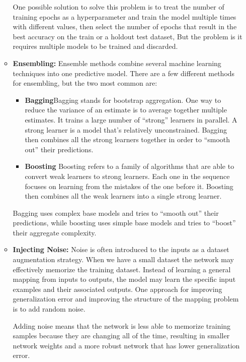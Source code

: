 \begin{itemize}
\begin{itemize}
    One possible solution to solve this problem is to treat the number of training epochs as a hyperparameter and train the model multiple times with different values, then select the number of epochs that result in the best accuracy on the train or a holdout test dataset, But the problem is it requires multiple models to be trained and discarded. \cite{goodfellow2016deep}\\
    \item \textbf{Ensembling: } Ensemble methods combine several machine learning techniques into one predictive model. There are a few different methods for ensembling, but the two most common are:
    \begin{itemize}
        \item \textbf{Bagging}Bagging stands for bootstrap aggregation. One way to reduce the variance of an estimate is to average together multiple estimates.
        It trains a large number of “strong” learners in parallel.
        A strong learner is a model that’s relatively unconstrained.
        Bagging then combines all the strong learners together in order to “smooth out” their predictions.
        \item  \textbf{Boosting}
        Boosting refers to a family of algorithms that are able to convert weak learners to strong learners.
        Each one in the sequence focuses on learning from the mistakes of the one before it.
        Boosting then combines all the weak learners into a single strong learner.
    \end{itemize}
    Bagging uses complex base models and tries to “smooth out” their predictions, while boosting uses simple base models and tries to “boost” their aggregate complexity.\\
    \item \textbf{Injecting Noise: }Noise is often introduced to the inputs as a dataset augmentation strategy. When we have a small dataset the network may effectively memorize the training dataset. Instead of learning a general mapping from inputs to outputs, the model may learn the specific input examples and their associated outputs. One approach for improving generalization error and improving the structure of the mapping problem is to add random noise.

    Adding noise means that the network is less able to memorize training samples because they are changing all of the time, resulting in smaller network weights and a more robust network that has lower generalization error.
    

\end{itemize}
\end{itemize}
